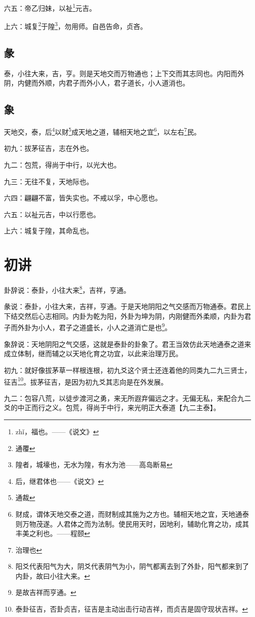 \documentclass[12pt,oneside]{book}
\begin{document}
六五：帝乙归妹，以祉\footnote{zhǐ，福也。——《说文》}元吉。

上六：城复\footnote{通覆}于隍\footnote{隍者，城壕也，无水为隍，有水为池——高岛断易}，勿用师。自邑告命，贞吝。

\subsection{彖}
泰，小往大来，吉，亨。则是天地交而万物通也；上下交而其志同也。内阳而外阴，内健而外顺，内君子而外小人，君子道长，小人道消也。

\subsection{象}
天地交，泰，后\footnote{后，继君体也——《说文》}以财\footnote{通裁}成天地之道，辅相天地之宜\footnote{财成，谓体天地交泰之道，而财制成其施为之方也。辅相天地之宜，天地通泰则万物茂遂。人君体之而为法制。使民用天时，因地利，辅助化育之功，成其丰美之利也。——程颐}，以左右\footnote{治理也}民。

初九：拔茅征吉，志在外也。

九二：包荒，得尚于中行，以光大也。

九三：无往不复，天地际也。

六四：翩翩不富，皆失实也。不戒以孚，中心愿也。

六五：以祉元吉，中以行愿也。

上六：城复于隍，其命乱也。

\section{初讲}
卦辞说：泰卦，小往大来\footnote{阳爻代表阳气为大，阴爻代表阴气为小，阴气都离去到了外卦，阳气都来到了内卦，故曰小往大来。}，吉祥，亨通。

彖说：泰卦，小往大来，吉祥，亨通。于是天地阴阳之气交感而万物通泰。君民上下结交然后心志相同。内卦为乾为阳，外卦为坤为阴，内刚健而外柔顺，内卦为君子而外卦为小人，君子之道盛长，小人之道消亡是也\footnote{是故吉祥而亨通。}。

象辞说：天地阴阳之气交感，这就是泰卦的卦象了。君王当效仿此天地通泰之道来成立体制，继而辅之以天地化育之功宜，以此来治理万民。

初九：就好像拔茅草一样根连根，初九爻这个贤士还连着他的同类九二九三贤士，征吉\footnote{泰卦征吉，否卦贞吉，征吉是主动出击行动吉祥，而贞吉是固守现状吉祥。}。拔茅征吉，是因为初九爻其志向是在外发展。

九二：包容八荒，以徒步渡河之勇，来无所遐弃偏远之才。无偏无私，来配合九二爻的中正而行之义。包荒，得尚于中行，来光明正大泰道【九二主泰】。
\end{document}
